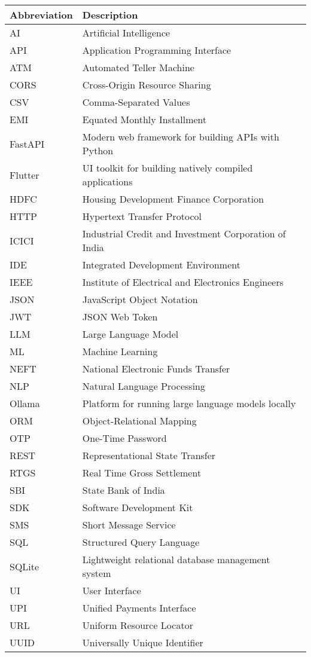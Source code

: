\documentclass[11pt,a4paper]{report}
\begin{document}
\begin{table}[h]
\begin{tabularx}{\textwidth}{lX}
\textbf{Abbreviation} & \textbf{Description} \\
\hline
AI & Artificial Intelligence \\
API & Application Programming Interface \\
ATM & Automated Teller Machine \\
CORS & Cross-Origin Resource Sharing \\
CSV & Comma-Separated Values \\
EMI & Equated Monthly Installment \\
FastAPI & Modern web framework for building APIs with Python \\
Flutter & UI toolkit for building natively compiled applications \\
HDFC & Housing Development Finance Corporation \\
HTTP & Hypertext Transfer Protocol \\
ICICI & Industrial Credit and Investment Corporation of India \\
IDE & Integrated Development Environment \\
IEEE & Institute of Electrical and Electronics Engineers \\
JSON & JavaScript Object Notation \\
JWT & JSON Web Token \\
LLM & Large Language Model \\
ML & Machine Learning \\
NEFT & National Electronic Funds Transfer \\
NLP & Natural Language Processing \\
Ollama & Platform for running large language models locally \\
ORM & Object-Relational Mapping \\
OTP & One-Time Password \\
REST & Representational State Transfer \\
RTGS & Real Time Gross Settlement \\
SBI & State Bank of India \\
SDK & Software Development Kit \\
SMS & Short Message Service \\
SQL & Structured Query Language \\
SQLite & Lightweight relational database management system \\
UI & User Interface \\
UPI & Unified Payments Interface \\
URL & Uniform Resource Locator \\
UUID & Universally Unique Identifier \\
\hline
\end{tabularx}
\end{table}
\end{document}
